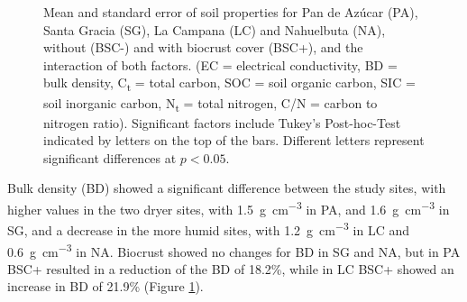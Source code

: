 \begin{figure}[htbp]
    \caption[Values of soil properties for the study sites, without and with biocrust cover, and the interaction of both factors]{Mean and standard error of soil properties for Pan de Azúcar (PA), Santa Gracia (SG), La Campana (LC) and Nahuelbuta (NA), without (BSC-) and with biocrust cover (BSC+), and the interaction of both factors. (EC = electrical conductivity, BD = bulk density, C\textsubscript{t} = total carbon, SOC = soil organic carbon, SIC = soil inorganic carbon, N\textsubscript{t} = total nitrogen, C/N = carbon to nitrogen ratio). Significant factors include Tukey's Post-hoc-Test indicated by letters on the top of the bars. Different letters represent significant differences at $p <0.05$.}
    \label{fig:M1-F2-soil_properties_panel} %

\end{figure}

\FloatBarrier

Bulk density (BD) showed a significant difference between the study sites, with higher values in the two dryer sites, with \SI{1.5}{\gram\per\cubic\centi\meter} in PA, and \SI{1.6}{\gram\per\cubic\centi\meter} in SG, and a decrease in the more humid sites, with \SI{1.2}{\gram\per\cubic\centi\meter} in LC and \SI{0.6}{\gram\per\cubic\centi\meter} in NA. Biocrust showed no changes for BD in SG and NA, but in PA BSC+ resulted in a reduction of the BD of 18.2\%, while in LC BSC+ showed an increase in BD of 21.9\% (Figure \ref{fig:M1-F2-soil_properties_panel}).

